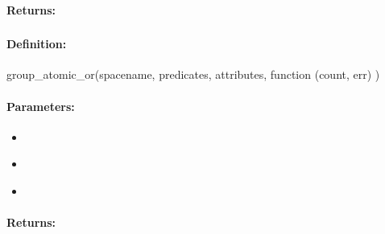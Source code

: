 \paragraph{Returns:}


\pagebreak
\subsubsection{}
\label{api:nodejs:group_atomic_or}


\paragraph{Definition:}
\begin{javascriptcode}
group_atomic_or(spacename, predicates, attributes, function (count, err) {})
\end{javascriptcode}
\paragraph{Parameters:}
\begin{itemize}[noitemsep]
\item {}\\

\item {}\\

\item {}\\

\end{itemize}

\paragraph{Returns:}


\pagebreak
\subsubsection{}
\label{api:nodejs:atomic_or}


